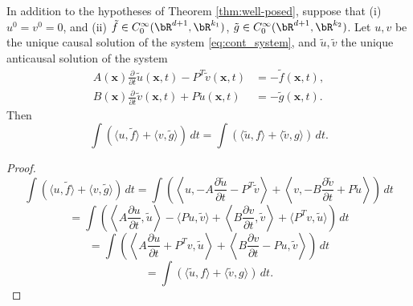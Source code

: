 \begin{theorem}\label{thm:adjointstate}
In addition to the hypotheses of Theorem \ref{thm:well-posed},
suppose that (i) $u^0=v^0=0$, and (ii)
$\tilde{f} \in C_0^{\infty}(\bR^{d+1},\bR^{k_1})$, $\tilde{g} \in
C_0^{\infty}(\bR^{d+1},\bR^{k_2})$. Let $u,v$ be the unique causal
solution of the system \ref{eq:cont_system}, and $\tilde{u},\tilde{v}$
the unique anticausal solution of the system
\begin{equation}\label{eq:adj_system}
\begin{split}
	A(\mathbf x)\frac{\partial}{\partial t}\tilde{u}(\mathbf x,t) - P^T \tilde{v}(\mathbf x,t) 
		&= -\tilde{f}(\mathbf x,t), \\
	B(\mathbf x)\frac{\partial}{\partial t}\tilde{v}(\mathbf x,t) + P\tilde{u}(\mathbf x,t) 
		&= -\tilde{g}(\mathbf x,t).
\end{split}
\end{equation}
Then
\begin{equation}
\label{eq:contadj}
\int (\langle u,\tilde{f} \rangle + \langle v, \tilde{g} \rangle) \, dt
= \int (\langle\tilde{u}, f \rangle + \langle \tilde{v},g \rangle) \, dt.
\end{equation}
\end{theorem}


\begin{proof}
\[
\int (\langle u,\tilde{f} \rangle + \langle v, \tilde{g} \rangle) \, dt
=
\int \left(\left\langle u,-A\frac{\partial \tilde{u}}{\partial t} -
    P^T \tilde{v}\right\rangle\right.
+
\left. \left\langle v,-B\frac{\partial \tilde{v}}{\partial t} + P
    \tilde{u}\right\rangle\right) \, dt
\]
\[
=
\int \left(\left\langle A\frac{\partial u}{\partial
      t},\tilde{u}\right\rangle
-\langle P u,\tilde{v}\rangle + \left\langle B\frac{\partial
    v}{\partial t},\tilde{v}\right\rangle + \langle
P^Tv,\tilde{u}\rangle
\right) \, dt
\]
\[
=
\int \left(\left\langle A\frac{\partial u}{\partial
      t} + P^Tv,\tilde{u}\right\rangle + \left\langle B\frac{\partial
    v}{\partial t}-Pu,\tilde{v}\right\rangle\right) \, dt
\]
\[
= \int (\langle\tilde{u}, f \rangle + \langle \tilde{v},g
\rangle) \, dt.
\]
\end{proof}

